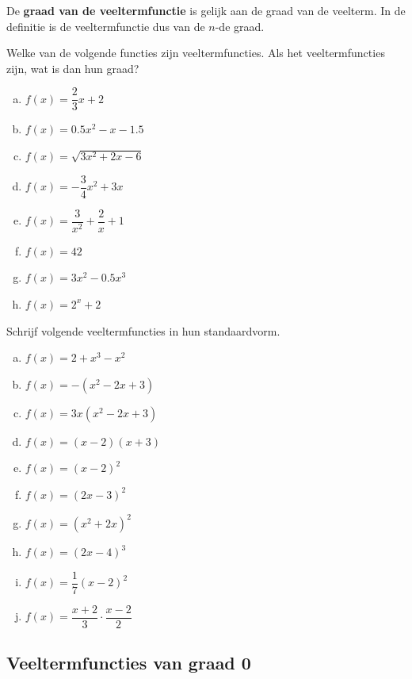 \documentclass[12pt]{article}
\begin{document}
De {\bf graad van de veeltermfunctie} is gelijk aan de graad van de veelterm. In de definitie is de veeltermfunctie dus van de $n$-de graad.



\begin{oefening}
  Welke van de volgende functies zijn veeltermfuncties. Als het veeltermfuncties zijn, wat is dan hun graad?
\begin{multicols}{2}
  \begin{enumerate}[(a)]
  \itemsep1em
  \item $f(x)=\dfrac{2}{3}x+2$
  \item $f(x)=0.5x^2-x-1.5$
  \item $f(x)=\sqrt{3x^2+2x-6}$
  \item $f(x)=-\dfrac{3}{4}x^2+3x$
  \item $f(x)=\dfrac{3}{x^2}+\dfrac{2}{x}+1$
  \item $f(x)=42$
  \item $f(x)=3x^2-0.5x^3$
  \item $f(x)=2^x+2$
  \end{enumerate}
\end{multicols}
\end{oefening}

\begin{oefening}
Schrijf volgende veeltermfuncties in hun standaardvorm.
\begin{multicols}{2}
  \begin{enumerate}[(a)]
  \itemsep1em
  \item $f(x)=2+x^3-x^2$
  \item $f(x)=-(x^2-2x+3)$
  \item $f(x)=3x(x^2-2x+3)$
  \item $f(x)=(x-2)(x+3)$
  \item $f(x)=(x-2)^2$
  \item $f(x)=(2x-3)^2$
  \item $f(x)=(x^2+2x)^2$
  \item $f(x)=(2x-4)^3$
  \item $f(x)=\dfrac{1}{7}(x-2)^2$
  \item $f(x)=\dfrac{x+2}{3}\cdot\dfrac{x-2}{2}$
  \end{enumerate}
\end{multicols}
\end{oefening}


\pagebreak
\subsection{Veeltermfuncties van graad 0}
\end{document}
